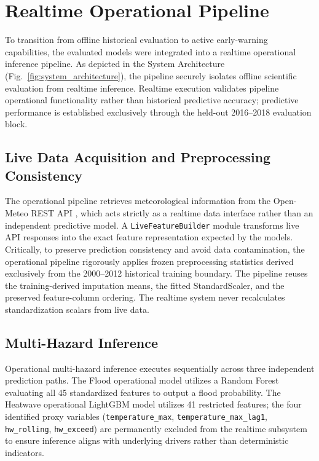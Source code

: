 \section{Realtime Operational Pipeline}
\label{sec:realtime}

To transition from offline historical evaluation to active early-warning capabilities, the evaluated models were integrated into a realtime operational inference pipeline. As depicted in the System Architecture (Fig.~\ref{fig:system_architecture}), the pipeline securely isolates offline scientific evaluation from realtime inference. Realtime execution validates pipeline operational functionality rather than historical predictive accuracy; predictive performance is established exclusively through the held-out 2016--2018 evaluation block.

\subsection{Live Data Acquisition and Preprocessing Consistency}
The operational pipeline retrieves meteorological information from the Open-Meteo REST API \cite{OpenMeteo2023}, which acts strictly as a realtime data interface rather than an independent predictive model. A \texttt{LiveFeatureBuilder} module transforms live API responses into the exact feature representation expected by the models. Critically, to preserve prediction consistency and avoid data contamination, the operational pipeline rigorously applies frozen preprocessing statistics derived exclusively from the 2000--2012 historical training boundary. The pipeline reuses the training-derived imputation means, the fitted StandardScaler, and the preserved feature-column ordering. The realtime system never recalculates standardization scalars from live data.

\subsection{Multi-Hazard Inference}
Operational multi-hazard inference executes sequentially across three independent prediction paths. The Flood operational model utilizes a Random Forest evaluating all 45 standardized features to output a flood probability. The Heatwave operational LightGBM model utilizes 41 restricted features; the four identified proxy variables (\texttt{temperature\_max}, \texttt{temperature\_max\_lag1}, \texttt{hw\_rolling}, \texttt{hw\_exceed}) are permanently excluded from the realtime subsystem to ensure inference aligns with underlying drivers rather than deterministic indicators. 

